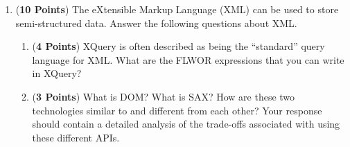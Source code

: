 \documentclass[12pt]{article}
\begin{document}
\begin{enumerate}



 
\newpage

\item ({\bf 10 Points}) The eXtensible Markup Language (XML) can be
  used to store semi-structured data.  Answer the following questions
  about XML.

  \begin{enumerate}
    
    \item ({\bf 4 Points}) XQuery is often described as being the
      ``standard'' query language for XML.  What are the FLWOR
      expressions that you can write in XQuery?

      \item ({\bf 3 Points}) What is DOM?  What is SAX?  How are these
      two technologies similar to and different from each other?  Your
      response should contain a detailed analysis of the trade-offs 
      associated with using these different APIs.


\end{enumerate}
\end{enumerate}
\end{document}
